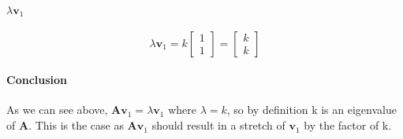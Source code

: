 \documentclass{article}
\begin{document}
        \paragraph{$\lambda \mathbf{v}_1$}
            \[
                \lambda \mathbf{v}_1
                =
                k
                \begin{bmatrix}
                    1\\1
                \end{bmatrix}
                =
                \begin{bmatrix}
                    k\\
                    k
                \end{bmatrix}
            \]
        \paragraph{Conclusion}
            As we can see above, $\mathbf{A}\mathbf{v}_1=\lambda \mathbf{v}_1$
            where $\lambda=k$, so by definition k is an eigenvalue of $\mathbf{A}$.
            This is the case as $\mathbf{A}\mathbf{v}_1$ 
            should result in a stretch of $\mathbf{v}_1$ by the factor of k.
\end{document}
